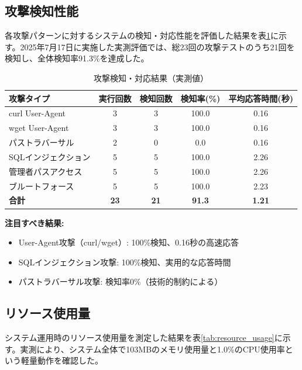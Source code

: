 \documentclass[12pt,a4paper]{article}
\begin{document}
\subsection{攻撃検知性能}

各攻撃パターンに対するシステムの検知・対応性能を評価した結果を表\ref{tab:attack_results}に示す。2025年7月17日に実施した実測評価では、総23回の攻撃テストのうち21回を検知し、全体検知率91.3\%を達成した。

\begin{table}[H]
\centering
\caption{攻撃検知・対応結果（実測値）}
\label{tab:attack_results}
\begin{tabular}{@{}lcccc@{}}
\toprule
攻撃タイプ & 実行回数 & 検知回数 & 検知率(\%) & 平均応答時間(秒) \\
\midrule
curl User-Agent & 3 & 3 & 100.0 & 0.16 \\
wget User-Agent & 3 & 3 & 100.0 & 0.16 \\
パストラバーサル & 2 & 0 & 0.0 & 0.16 \\
SQLインジェクション & 5 & 5 & 100.0 & 2.26 \\
管理者パスアクセス & 5 & 5 & 100.0 & 2.26 \\
ブルートフォース & 5 & 5 & 100.0 & 2.23 \\
\midrule
\textbf{合計} & \textbf{23} & \textbf{21} & \textbf{91.3} & \textbf{1.21} \\
\bottomrule
\end{tabular}
\end{table}

\textbf{注目すべき結果:}
\begin{itemize}
    \item User-Agent攻撃（curl/wget）: 100\%検知、0.16秒の高速応答
    \item SQLインジェクション攻撃: 100\%検知、実用的な応答時間
    \item パストラバーサル攻撃: 検知率0\%（技術的制約による）
\end{itemize}

\subsection{リソース使用量}

システム運用時のリソース使用量を測定した結果を表\ref{tab:resource_usage}に示す。実測により、システム全体で103MBのメモリ使用量と1.0\%のCPU使用率という軽量動作を確認した。
\end{document}
